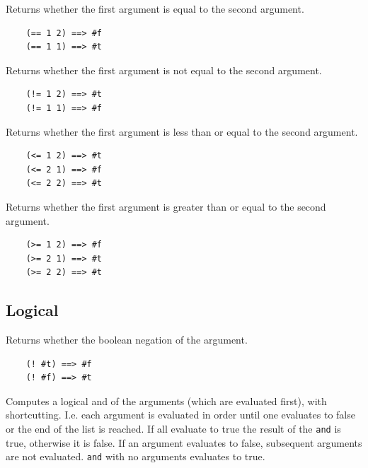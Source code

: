 \documentclass[12pt]{article}
\begin{document}
Returns whether the first argument is equal to the second argument.

\begin{verbatim}
    (== 1 2) ==> #f
    (== 1 1) ==> #t
\end{verbatim}


Returns whether the first argument is not equal to the second argument.

\begin{verbatim}
    (!= 1 2) ==> #t
    (!= 1 1) ==> #f
\end{verbatim}


Returns whether the first argument is less than or equal to the second
argument. 

\begin{verbatim}
    (<= 1 2) ==> #t
    (<= 2 1) ==> #f
    (<= 2 2) ==> #t
\end{verbatim}


Returns whether the first argument is greater than or equal to the
second argument. 

\begin{verbatim}
    (>= 1 2) ==> #f
    (>= 2 1) ==> #t
    (>= 2 2) ==> #t
\end{verbatim}

\subsection{Logical}


Returns whether the boolean negation of the argument.

\begin{verbatim}
    (! #t) ==> #f
    (! #f) ==> #t
\end{verbatim}


Computes a logical and of the arguments (which are evaluated first),
with shortcutting. I.e. each argument is evaluated in order until one
evaluates to false or the end of the list is reached. If all evaluate
to true the result of the \verb|and| is true, otherwise it is false.
If an argument evaluates to false, subsequent arguments are not
evaluated. \verb|and| with no arguments evaluates to true.
\end{document}
